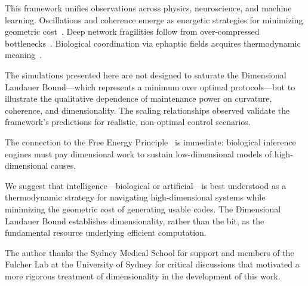 \documentclass[aps,prx,twocolumn,superscriptaddress,floatfix]{revtex4-2}
\begin{document}
This framework unifies observations across physics, neuroscience, and machine learning. Oscillations and coherence emerge as energetic strategies for minimizing geometric cost~\cite{buzsaki2006,fries2015}. Deep network fragilities follow from over-compressed bottlenecks~\cite{shwartzziv2017}. Biological coordination via ephaptic fields acquires thermodynamic meaning~\cite{anastassiou2011}.

The simulations presented here are not designed to saturate the Dimensional Landauer Bound---which represents a minimum over optimal protocols---but to illustrate the qualitative dependence of maintenance power on curvature, coherence, and dimensionality. The scaling relationships observed validate the framework's predictions for realistic, non-optimal control scenarios.

The connection to the Free Energy Principle~\cite{friston2010} is immediate: biological inference engines must pay dimensional work to sustain low-dimensional models of high-dimensional causes.

We suggest that intelligence---biological or artificial---is best understood as a thermodynamic strategy for navigating high-dimensional systems while minimizing the geometric cost of generating usable codes. The Dimensional Landauer Bound establishes dimensionality, rather than the bit, as the fundamental resource underlying efficient computation.

\begin{acknowledgments}
The author thanks the Sydney Medical School for support and members of the Fulcher Lab at the University of Sydney for critical discussions that motivated a more rigorous treatment of dimensionality in the development of this work.
\end{acknowledgments}


\end{document}
